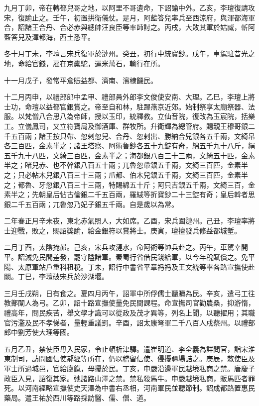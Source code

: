 \begin{pinyinscope}
 九月丁卯，帝在轉都兒哥之地，以阿里不哥遺命，下詔諭中外。乙亥，李璮復請攻宋，復諭止之。壬午，初置拱衛儀仗。是月，阿藍答兒率兵至西涼府，與渾都海軍合，詔諸王合丹、合必赤與總帥汪良臣等率師討之。丙戌，大敗其軍於姑臧，斬阿藍答兒及渾都海，西土悉平。



 冬十月丁未，李璮言宋兵復軍於漣州。癸丑，初行中統寶鈔。戊午，車駕駐昔光之地，命給官錢，雇在京橐駝，運米萬石，輸行在所。



 十一月戊子，發常平倉賑益都、濟南、濱棣饑民。



 十二月丙申，以禮部郎中孟甲、禮部員外郎李文俊使安南、大理。乙巳，李璮上將士功，命璮以益都官銀賞之。帝至自和林，駐蹕燕京近郊。始制祭享太廟祭器、法服。以梵僧八合思八為帝師，授以玉印，統釋教。立仙音院，復改為玉宸院，括樂工。立儀鳳司，又立符寶局及御酒庫、群牧所。升衛輝為總管府。賜親王穆哥銀二千五百兩；諸王按只帶、忽剌忽兒、合丹、忽剌出、勝納合兒銀各五千兩，文綺帛各三百匹，金素半之；諸王塔察、阿術魯鈔各五十九錠有奇，綿五千九十八斤，絹五千九十八匹，文綺三百匹，金素半之；海都銀八百三十三兩，文綺五十匹，金素半之；睹兒赤、也不幹銀八百五十兩；兀魯忽帶銀五千兩，文綺三百匹，金素半之；只必帖木兒銀八百三十三兩；爪都、伯木兒銀五千兩，文綺三百匹，金素半之；都魯、牙忽銀八百三十三兩，特賜綿五十斤；阿只吉銀五千兩，文綺三百，金素半之；先朝皇后怗古倫銀二千五百兩，羅絨等折寶鈔二十三錠有奇；皇后斡者思銀二千五百兩；兀魯忽乃妃子銀五千兩。自是歲以為常。



 二年春正月辛未夜，東北赤氣照人，大如席。乙酉，宋兵圍漣州。己丑，李璮率將士迎戰，敗之，賜詔獎諭，給金銀符以賞將士。庚寅，璮擅發兵修益都城塹。



 二月丁酉，太陰掩昴。己亥，宋兵攻漣水，命阿術等帥兵赴之。丙午，車駕幸開平。詔減免民間差發，罷守隘諸軍。秦蜀行省借民錢給軍，以今年稅賦償之。免平陽、太原軍站戶重科租稅。丁未，詔行中書省平章祃祃及王文統等率各路宣撫使赴闕。丁巳，李璮破宋兵於沙湖堰。



 三月壬戌朔，日有食之。夏四月丙午，詔軍中所俘儒士聽贖為民。辛亥，遣弓工往教鄯闡人為弓。乙卯，詔十路宣撫使量免民間課程。命宣撫司官勸農桑，抑游惰，禮高年，問民疾苦，舉文學才識可以從政及茂才異等，列名上聞，以聽擢用；其職官污濫及民不孝悌者，量輕重議罰。辛酉，詔太康弩軍二千八百人戍蔡州。以禮部郎中劉芳使大理等國。



 五月乙丑，禁使臣毋入民家，令止頓析津驛。遣崔明道、李全義為詳問官，詣宋淮東制司，訪問國信使郝經等所在，仍以稽留信使、侵擾疆場詰之。庚辰，敕使臣及軍士所過城邑，官給廩餼，毋擾於民。丁亥，申嚴沿邊軍民越境私商之禁。唐慶子政臣入見，詔復其家。弛諸路山澤之禁。禁私殺馬牛。申嚴越境私商，販馬匹者罪死。以河南經略宣撫使史天澤為中書右丞相，河南軍民並聽節制。詔成都路置惠民藥局。遣王祐於西川等路採訪醫、儒、僧、道。




\end{pinyinscope}
